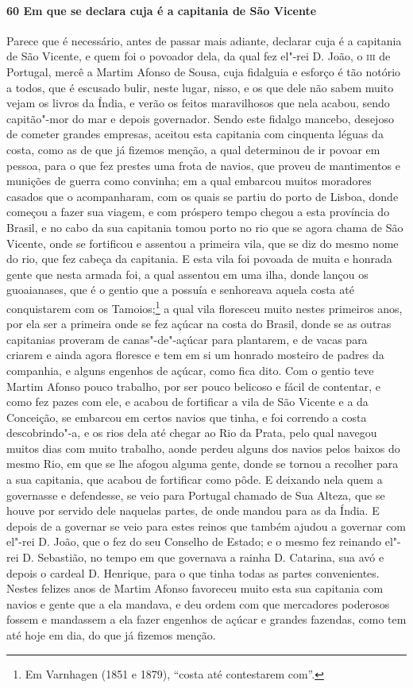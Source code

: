 \begin{linenumbers}
\paragraph{60 Em que se declara cuja é a capitania de São Vicente} \quad
Parece que é necessário, antes de passar mais adiante, declarar cuja é a capitania de São
Vicente, e quem foi o povoador dela, da qual fez el"-rei D. João, o \textsc{iii} de
Portugal, mercê a Martim Afonso de Sousa, cuja fidalguia e esforço é tão notório a todos,
que é escusado bulir, neste lugar, nisso, e os que dele não sabem muito vejam os livros da
Índia, e verão os feitos maravilhosos que nela acabou, sendo capitão"-mor do mar e depois
governador. Sendo este fidalgo mancebo, desejoso de cometer grandes empresas, aceitou esta
capitania com cinquenta léguas da costa, como as de que já fizemos menção, a qual
determinou de ir povoar em pessoa, para o que fez prestes uma frota de navios, que proveu
de mantimentos e munições de guerra como convinha; em a qual embarcou muitos moradores
casados que o acompanharam, com os quais se partiu do porto de Lisboa, donde começou a
fazer sua viagem, e com próspero tempo chegou a esta província do Brasil, e no cabo da sua
capitania tomou porto no rio que se agora chama de São Vicente, onde se fortificou e
assentou a primeira vila, que se diz do mesmo nome do rio, que fez cabeça da capitania. E
esta vila foi povoada de muita e honrada gente que nesta armada foi, a qual assentou em
uma ilha, donde lançou os guoaianases, que é o gentio que a possuía e senhoreava aquela
costa até conquistarem com os Tamoios;\footnote{ Em Varnhagen (1851 e 1879), ``costa até
contestarem com''.} a qual vila floresceu muito nestes primeiros anos, por ela ser a
primeira onde se fez açúcar na costa do Brasil, donde se as outras capitanias proveram de
canas"-de"-açúcar para plantarem, e de vacas para criarem e ainda agora floresce e tem em si
um honrado mosteiro de padres da companhia, e alguns engenhos de açúcar, como fica dito.
Com o gentio teve Martim Afonso pouco trabalho, por ser pouco belicoso e fácil de
contentar, e como fez pazes com ele, e acabou de fortificar a vila de São Vicente e a da
Conceição, se embarcou em certos navios que tinha, e foi correndo a costa descobrindo"-a, e
os rios dela até chegar ao Rio da Prata, pelo qual navegou muitos dias com muito trabalho,
aonde perdeu alguns dos navios pelos baixos do mesmo Rio, em que se lhe afogou alguma
gente, donde se tornou a recolher para a sua capitania, que acabou de fortificar como
pôde. E deixando nela quem a governasse e defendesse, se veio para Portugal chamado de Sua
Alteza, que se houve por servido dele naquelas partes, de onde mandou para as da Índia. E
depois de a governar se veio para estes reinos que também ajudou a governar com el"-rei D.
João, que o fez do seu Conselho de Estado; e o mesmo fez reinando el"-rei D. Sebastião, no
tempo em que governava a rainha D. Catarina, sua avó e depois o cardeal D. Henrique, para
o que tinha todas as partes convenientes. Nestes felizes anos de Martim Afonso favoreceu
muito esta sua capitania com navios e gente que a ela mandava, e deu ordem com que
mercadores poderosos fossem e mandassem a ela fazer engenhos de açúcar e grandes fazendas,
como tem até hoje em dia, do que já fizemos menção.


\end{linenumbers}

